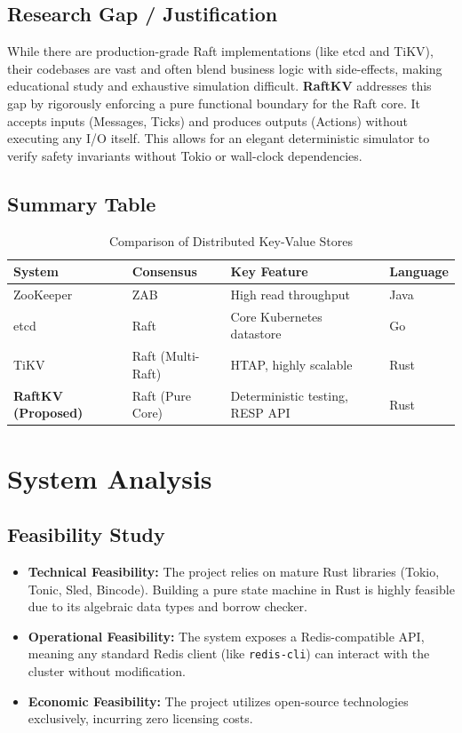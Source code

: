 \documentclass[12pt,a4paper]{report}
\begin{document}
\section{Research Gap / Justification}
While there are production-grade Raft implementations (like etcd and TiKV), their codebases are vast and often blend business logic with side-effects, making educational study and exhaustive simulation difficult. \textbf{RaftKV} addresses this gap by rigorously enforcing a pure functional boundary for the Raft core. It accepts inputs (Messages, Ticks) and produces outputs (Actions) without executing any I/O itself. This allows for an elegant deterministic simulator to verify safety invariants without Tokio or wall-clock dependencies.

\section{Summary Table}
\begin{table}[H]
\centering
\begin{tabularx}{\textwidth}{|l|X|X|l|}
\hline
\textbf{System} & \textbf{Consensus} & \textbf{Key Feature} & \textbf{Language} \\ \hline
ZooKeeper & ZAB & High read throughput & Java \\ \hline
etcd & Raft & Core Kubernetes datastore & Go \\ \hline
TiKV & Raft (Multi-Raft) & HTAP, highly scalable & Rust \\ \hline
\textbf{RaftKV (Proposed)} & Raft (Pure Core) & Deterministic testing, RESP API & Rust \\ \hline
\end{tabularx}
\caption{Comparison of Distributed Key-Value Stores}
\end{table}

\chapter{System Analysis}

\section{Feasibility Study}
\begin{itemize}
    \item \textbf{Technical Feasibility:} The project relies on mature Rust libraries (Tokio, Tonic, Sled, Bincode). Building a pure state machine in Rust is highly feasible due to its algebraic data types and borrow checker.
    \item \textbf{Operational Feasibility:} The system exposes a Redis-compatible API, meaning any standard Redis client (like \texttt{redis-cli}) can interact with the cluster without modification.
    \item \textbf{Economic Feasibility:} The project utilizes open-source technologies exclusively, incurring zero licensing costs.
\end{itemize}
\end{document}
